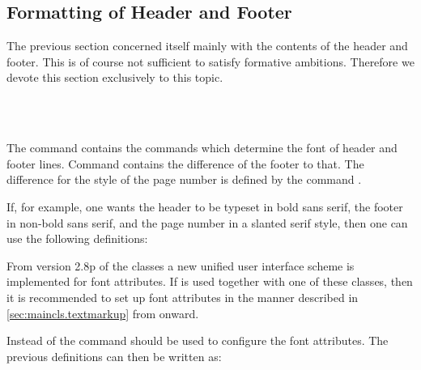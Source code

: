 \subsection{Formatting of Header and Footer}
The previous section concerned itself mainly with the contents of the
header and footer. This is of course not sufficient to satisfy
formative ambitions. Therefore we devote this section exclusively to
this topic.

\begin{Declaration}
  \\
  \\
\end{Declaration}%
%
%
%
The command  contains the commands which determine the font of
header and footer lines.  Command  contains the difference of
the footer to that. The difference for the style of the page number is defined
by the command .
\begin{Example}
  If, for example, one wants the header to be typeset in bold sans serif, the
  footer in non-bold sans serif, and the page number in a slanted serif style,
  then one can use the following definitions:
\begin{lstcode}
  \renewcommand{\headfont}{\normalfont\sffamily\bfseries}
  \renewcommand*{\footfont}{\normalfont\sffamily}
  \renewcommand{\pnumfont}{\normalfont\rmfamily\slshape}
\end{lstcode}
\end{Example}
%
%
%

%
%
%
From version 2.8p of the {\KOMAScript} classes a new unified user interface
scheme is implemented for font attributes. If  is used
together with one of these classes, then it is recommended to set up font
attributes in the manner described in \autoref{sec:maincls.textmarkup} from
 onward.
\begin{Example}
  Instead of  the command 
  should be used to configure the font attributes. The previous
  definitions can then be written as:
\begin{lstcode}
  \normalfont\sffamily\bfseries}
  \setkomafont{pagefoot}{\normalfont\sffamily}
  \setkomafont{pagenumber}{\normalfont\rmfamily\slshape}
\end{lstcode}
\end{Example}
%
%
%


